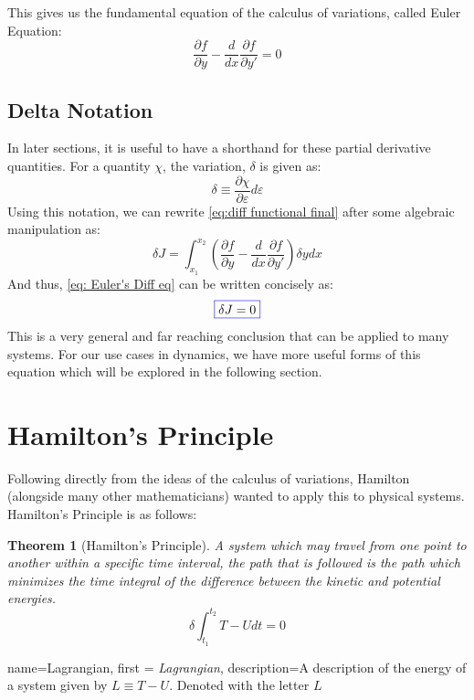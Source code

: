 \documentclass[12pt]{report}
\newtheorem{theorem}{Theorem}
\begin{document}
This gives us the fundamental equation of the calculus of variations, called \gls{Euler Equation}:
\begin{equation}\label{eq: Euler's Diff eq}
    \frac{\partial f}{\partial y}-\frac{d}{dx}\frac{\partial f}{\partial y'}=0
\end{equation}
\subsection{Delta Notation}
In later sections, it is useful to have a shorthand for these partial derivative quantities. For a quantity $\chi$, the variation, $\delta$ is given as:
$$\delta\equiv\frac{\partial\chi}{\partial \varepsilon}d\varepsilon$$Using this notation, we can rewrite \eqref{eq:diff functional final} after some algebraic manipulation as:
\begin{equation}
    \delta J= \int_{x_1}^{x_2}\left(\frac{\partial f}{\partial y}-\frac{d}{dx}\frac{\partial f}{\partial y'}\right)\delta y{dx}
\end{equation}
And thus, \eqref{eq: Euler's Diff eq} can be written concisely as:
\begin{equation}
    \color{blue}\boxed{\color{black}\delta J=0}
\end{equation}
This is a very general and far reaching conclusion that can be applied to many systems. For our use cases in dynamics, we have more useful forms of this equation which will be explored in the following section.

\section{Hamilton's Principle}

Following directly from the ideas of the calculus of variations, Hamilton (alongside many other mathematicians) wanted to apply this to physical systems. Hamilton's Principle is as follows:
\begin{theorem}[Hamilton's Principle]
A system which may travel from one point to another within a specific time interval, the path that is followed is the path which minimizes the time integral of the difference between the kinetic and potential energies.
$$\delta \int_{t_1}^{t_2}{T-U}{dt}=0$$
\end{theorem}
{
    name=Lagrangian,
    first = {\textit{Lagrangian}},
    description={A description of the energy of a system given by $L\equiv T-U$. Denoted with the letter $L$}
}
\end{document}
